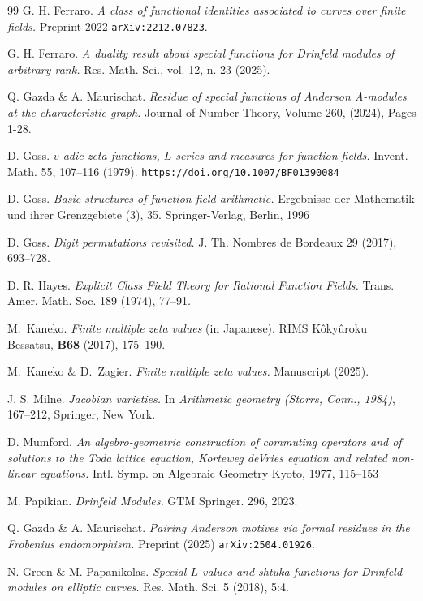 \documentclass[11pt]{amsart}
\numberwithin{equation}{section}
\begin{document}
\begin{thebibliography}{99}
 G. H. Ferraro. {\em A class of functional identities associated to curves over finite fields.} Preprint 2022 {\tt arXiv:2212.07823}.

 G. H. Ferraro. {\em A duality result about special functions for Drinfeld modules of arbitrary rank.} Res. Math. Sci., vol. 12, n. 23 (2025).

 Q. Gazda \& A. Maurischat.
{\em Residue of special functions of Anderson A-modules at the characteristic graph.}
Journal of Number Theory,
Volume 260,
(2024), Pages 1-28.

 D. Goss. {\em $v$-adic zeta functions, $L$-series and measures for function fields.} Invent. Math. 55, 107--116 (1979). {\tt https://doi.org/10.1007/BF01390084}

 D. Goss. {\em Basic structures of function field arithmetic.} Ergebnisse der Mathematik und ihrer Grenzgebiete (3), 35. Springer-Verlag, Berlin, 1996

 D. Goss. {\em Digit permutations revisited.}
J. Th. Nombres
de Bordeaux 29 (2017), 693--728.

 D. R. Hayes. {\em Explicit Class Field Theory for Rational Function Fields.} Trans. Amer. Math. Soc. 189 (1974), 77--91.

 M.~Kaneko. {\em Finite multiple zeta values} (in Japanese).  RIMS K\^oky\^uroku Bessatsu,  \textbf{B68} (2017), 175--190.

 M.~Kaneko \& D.~Zagier. {\em Finite multiple zeta values.} Manuscript (2025).

 J. S. Milne. {\em Jacobian varieties.} In {\it Arithmetic geometry (Storrs, Conn., 1984)}, 167--212, Springer, New York.

 D. Mumford. {\em An algebro-geometric construction of commuting
operators and of solutions to the Toda lattice
equation, Korteweg deVries equation and
related non-linear equations.} Intl. Symp. on Algebraic Geometry
Kyoto, 1977, 115--153

 M. Papikian. {\em Drinfeld Modules.} GTM Springer. 296, 2023.

 Q. Gazda \& A. Maurischat. {\em Pairing Anderson motives via formal residues in the Frobenius endomorphism.} Preprint (2025) {\tt arXiv:2504.01926}.

 N. Green \& M. Papanikolas. {\em Special $L$-values and shtuka functions for Drinfeld modules on elliptic curves.} Res. Math. Sci. 5 (2018), 5:4.


\end{thebibliography}
\end{document}
